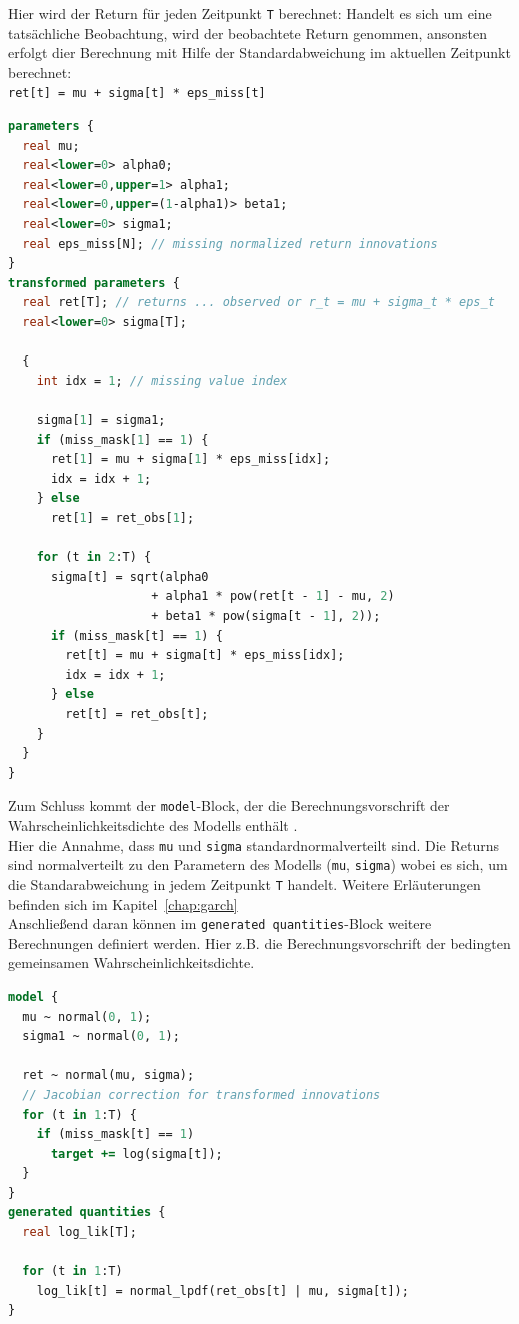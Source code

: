 \documentclass[ngerman]{ttlab-qualify}
\begin{document}
Hier wird der Return für jeden Zeitpunkt \verb|T| berechnet: Handelt es sich um eine tatsächliche Beobachtung, wird der beobachtete Return genommen, ansonsten erfolgt dier Berechnung mit Hilfe der Standardabweichung im aktuellen Zeitpunkt berechnet:\\
\verb|ret[t] = mu + sigma[t] * eps_miss[t]|

\begin{lstlisting}[language=Stan]
parameters {
  real mu;
  real<lower=0> alpha0;
  real<lower=0,upper=1> alpha1;
  real<lower=0,upper=(1-alpha1)> beta1;
  real<lower=0> sigma1;
  real eps_miss[N]; // missing normalized return innovations
}
transformed parameters {
  real ret[T]; // returns ... observed or r_t = mu + sigma_t * eps_t
  real<lower=0> sigma[T];

  {
    int idx = 1; // missing value index

    sigma[1] = sigma1;
    if (miss_mask[1] == 1) {
      ret[1] = mu + sigma[1] * eps_miss[idx];
      idx = idx + 1;
    } else
      ret[1] = ret_obs[1];

    for (t in 2:T) {
      sigma[t] = sqrt(alpha0
                    + alpha1 * pow(ret[t - 1] - mu, 2)
                    + beta1 * pow(sigma[t - 1], 2));
      if (miss_mask[t] == 1) {
        ret[t] = mu + sigma[t] * eps_miss[idx];
        idx = idx + 1;
      } else
        ret[t] = ret_obs[t];
    }
  }
}
\end{lstlisting}

Zum Schluss kommt der \verb|model|-Block, der die Berechnungsvorschrift der Wahrscheinlichkeitsdichte des Modells enthält \parencite{stan:2017}.\\
Hier die Annahme, dass \verb|mu| und \verb|sigma| standardnormalverteilt sind. Die Returns sind normalverteilt zu den Parametern des Modells (\verb|mu|, \verb|sigma|) wobei es sich, um die Standarabweichung in jedem Zeitpunkt \verb|T| handelt. Weitere Erläuterungen befinden sich im Kapitel~\ref{chap:garch} \\

Anschließend daran können im \verb|generated quantities|-Block weitere Berechnungen definiert werden. 
Hier z.B. die Berechnungsvorschrift der bedingten gemeinsamen Wahrscheinlichkeitsdichte.

\begin{lstlisting}[language=Stan]
model {
  mu ~ normal(0, 1);
  sigma1 ~ normal(0, 1);

  ret ~ normal(mu, sigma);
  // Jacobian correction for transformed innovations
  for (t in 1:T) {
    if (miss_mask[t] == 1)
      target += log(sigma[t]);
  }
}
generated quantities {
  real log_lik[T];

  for (t in 1:T)
    log_lik[t] = normal_lpdf(ret_obs[t] | mu, sigma[t]);
}

\end{lstlisting}
\end{document}
